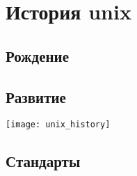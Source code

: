 \chapter {История unix}
\section {Рождение}
\section {Развитие}
\texttt{[image: unix\_history]}
\section {Стандарты}



